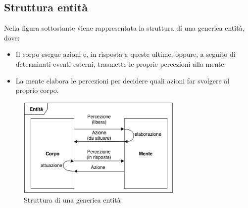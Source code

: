 \subsection{Struttura entità}
Nella figura sottostante viene rappresentata la struttura di una generica entità, dove:

\begin{itemize}
   \item Il corpo esegue azioni e, in risposta a queste ultime, oppure, a seguito di determinati eventi esterni, trasmette le proprie percezioni alla mente.
   \item La mente elabora le percezioni per decidere quali azioni far svolgere al proprio corpo.
\end{itemize}

\begin{figure}[H]
   \centering
   \includegraphics[width=8cm]{figures/Entita_struttura.png}
   \caption{Struttura di una generica entità}
\end{figure}